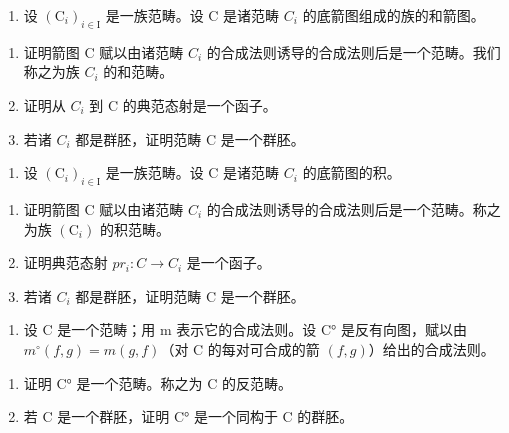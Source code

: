 \exercisegroup

\begin{enumerate}
\def\labelenumi{\arabic{enumi})}
\tightlist
\item
  设 \((\mathrm{C}_{i})_{i\in\mathrm{I}}\) 是一族范畴。设 C 是诸范畴 \(C_{i}\) 的底箭图组成的族的和箭图。
\end{enumerate}

\begin{enumerate}
\def\labelenumi{\alph{enumi})}
\item
  证明箭图 C 赋以由诸范畴 \(C_{i}\) 的合成法则诱导的合成法则后是一个范畴。我们称之为族 \(C_{i}\) 的和范畴。
\item
  证明从 \(C_{i}\) 到 C 的典范态射是一个函子。
\item
  若诸 \(C_{i}\) 都是群胚，证明范畴 C 是一个群胚。
\end{enumerate}

\begin{enumerate}
\def\labelenumi{\arabic{enumi})}
\setcounter{enumi}{1}
\tightlist
\item
  设 \((\mathrm{C}_{i})_{i\in\mathrm{I}}\) 是一族范畴。设 C 是诸范畴 \(C_{i}\) 的底箭图的积。
\end{enumerate}

\begin{enumerate}
\def\labelenumi{\alph{enumi})}
\item
  证明箭图 C 赋以由诸范畴 \(C_{i}\) 的合成法则诱导的合成法则后是一个范畴。称之为族 \((\mathrm{C}_{i})\) 的积范畴。
\item
  证明典范态射 \(pr_{i}: C \rightarrow C_{i}\) 是一个函子。
\item
  若诸 \(C_{i}\) 都是群胚，证明范畴 C 是一个群胚。
\end{enumerate}

\begin{enumerate}
\def\labelenumi{\arabic{enumi})}
\setcounter{enumi}{2}
\tightlist
\item
  设 C 是一个范畴；用 m 表示它的合成法则。设 C° 是反有向图，赋以由 \(m^{\circ}(f,g)=m(g,f)\)（对 C 的每对可合成的箭 \((f,g)\)）给出的合成法则。
\end{enumerate}

\begin{enumerate}
\def\labelenumi{\alph{enumi})}
\item
  证明 C° 是一个范畴。称之为 C 的反范畴。
\item
  若 C 是一个群胚，证明 C° 是一个同构于 C 的群胚。
\end{enumerate}

